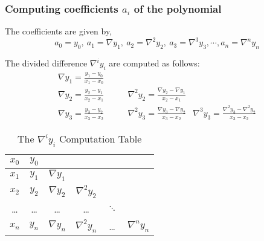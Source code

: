 \subsubsection{Computing coefficients $a_i$ of the polynomial}
The coefficients are given by,
\begin{equation}
	a_0 = y_0,\ a_1 = \nabla y_1,\ a_2 = \nabla^2 y_2,\ a_3 = \nabla^3 y_3,\cdots, a_n = \nabla^n y_n
\end{equation}
\begin{remark}
	The divided difference $\nabla^i y_i$ are computed as follows:
	\begin{align*}
		\nabla y_1 = \frac{y_1 - y_0}{x_1 - x_0} & & \\
		\nabla y_2 = \frac{y_2 - y_1}{x_2 - x_1} &\qquad \nabla^2 y_2 = \frac{\nabla y_2 - \nabla y_1}{x_2-x_1} & \\
		\nabla y_3 = \frac{y_3 - y_2}{x_3 - x_2} &\qquad \nabla^2 y_3 = \frac{\nabla y_3 - \nabla y_2}{x_3-x_2} & \nabla^3 y_3 = \frac{\nabla^2 y_3 - \nabla^2 y_2}{x_3-x_2}
	\end{align*}
\end{remark}
\begin{table}[hb]
	\centering
	\begin{tabular}{|c||c|c|c|c|c|}
		\hline
		$x_0$ & $y_0$ & & & & \\ \hline
		$x_1$ & $y_1$ & $\nabla y_1$ & & &   \\ \hline
		$x_2$ & $y_2$ & $\nabla y_2$ & $\nabla^2 y_2$ & &   \\ \hline
		\dots & \dots & \dots & \dots & $\ddots$ & \\ \hline
		$x_n$ & $y_n$ & $\nabla y_n$ & $\nabla^2 y_n$ & \dots & $\nabla^n y_n$  \\ \hline
	\end{tabular}
	\caption{The $\nabla^i y_i$ Computation Table}
\end{table}

